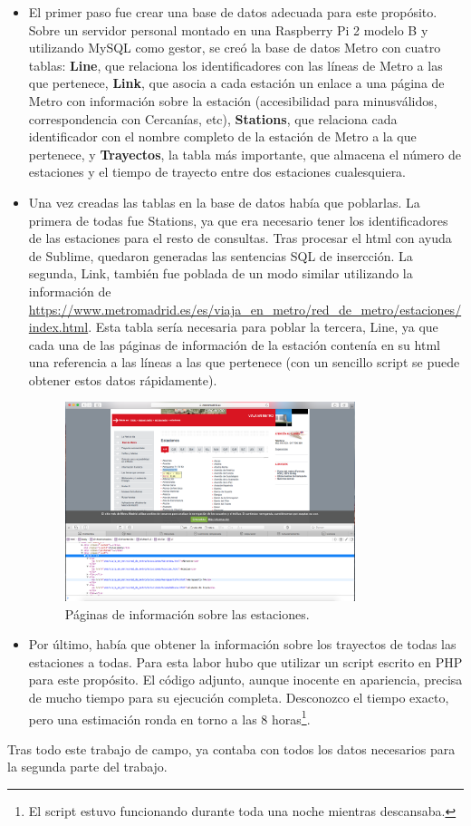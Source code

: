 \documentclass[spanish, a4paper, 12pt] {article}
\begin{document}
\begin{itemize}
\item {
El primer paso fue crear una base de datos adecuada para este propósito. Sobre un servidor personal montado en una Raspberry Pi 2 modelo B y utilizando MySQL como gestor, se creó la base de datos Metro con cuatro tablas: {\bf Line}, que relaciona los identificadores con las líneas de Metro a las que pertenece, {\bf Link}, que asocia a cada estación un enlace a una página de Metro con información sobre la estación (accesibilidad para minusválidos, correspondencia con Cercanías, etc), {\bf Stations}, que relaciona cada identificador con el nombre completo de la estación de Metro a la que pertenece, y {\bf Trayectos}, la tabla más importante, que almacena el número de estaciones y el tiempo de trayecto entre dos estaciones cualesquiera.
}
\item {
Una vez creadas las tablas en la base de datos había que poblarlas. La primera de todas fue Stations, ya que era necesario tener los identificadores de las estaciones para el resto de consultas. Tras procesar el html con ayuda de Sublime, quedaron generadas las sentencias SQL de insercción. La segunda, Link, también fue poblada de un modo similar utilizando la información de \url{https://www.metromadrid.es/es/viaja_en_metro/red_de_metro/estaciones/index.html}. Esta tabla sería necesaria para poblar la tercera, Line, ya que cada una de las páginas de información de la estación contenía en su html una referencia a las líneas a las que pertenece (con un sencillo script se puede obtener estos datos rápidamente).\\ \par
{\begin{figure}[!ht]
\centering
\includegraphics[width=0.8\textwidth]{info.png}
\caption{Páginas de información sobre las estaciones.}
\end{figure}}
}
\item {
Por último, había que obtener la información sobre los trayectos de todas las estaciones a todas. Para esta labor hubo que utilizar un script escrito en PHP para este propósito. El código adjunto, aunque inocente en apariencia, precisa de mucho tiempo para su ejecución completa. Desconozco el tiempo exacto, pero una estimación ronda en torno a las 8 horas\footnote{El script estuvo funcionando durante toda una noche mientras descansaba.}.
}
\end{itemize}
Tras todo este trabajo de campo, ya contaba con todos los datos necesarios para la segunda parte del trabajo.
\end{document}
